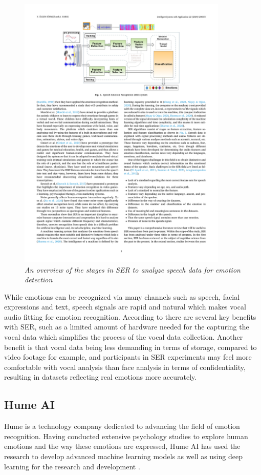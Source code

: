 \begin{figure}[ht]
    \centering
    \includegraphics[width=10cm]{png/theoretical/ser-diagram.pdf}
    \caption{\textit{An overview of the stages in SER to analyze speech data for emotion detection} \autocite{LGENSNMEZ2024}}
    \label{fig:stages-SER}
\end{figure}
 
While emotions can be recognized via many channels such as speech, facial expressions and text, speech signals are rapid and natural which makes vocal audio fitting for emotion recognition. According to \textcite{LGENSNMEZ2024} there are several key benefits with SER, such as a limited amount of hardware needed for the capturing the vocal data which simplifies the process of the vocal data collection. Another benefit is that vocal data being less demanding in terms of storage, compared to video footage for example, and participants in SER experiments may feel more comfortable with vocal analysis than face analysis in terms of confidentiality, resulting in datasets reflecting real emotions more accurately.

\subsection{Hume AI }

Hume is a technology company dedicated to advancing the field of emotion recognition. Having conducted extensive psychology studies to explore human emotions and the way these emotions are expressed, Hume AI has used the research to develop advanced machine learning models \autocite{HumeAi-aboutScience} as well as using deep learning for the research and development \autocite{Brooks2023}.

